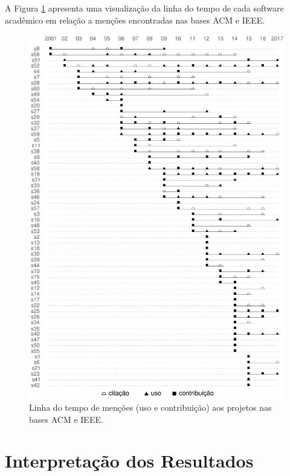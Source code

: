 A Figura \ref{mentions-timeline} apresenta uma visualização da linha do tempo
de cada software acadêmico em relação a menções encontradas nas bases ACM e IEEE.

\begin{figure}[h]
  \center
  \includegraphics[scale=0.6]{imagens/mentions-timeline.png}
  \caption{Linha do tempo de menções (uso e contribuição) aos projetos nas bases ACM e IEEE.}
  \label{mentions-timeline}
\end{figure}


\section{Interpretação dos Resultados} \label{estudo2:interpretacao} %

